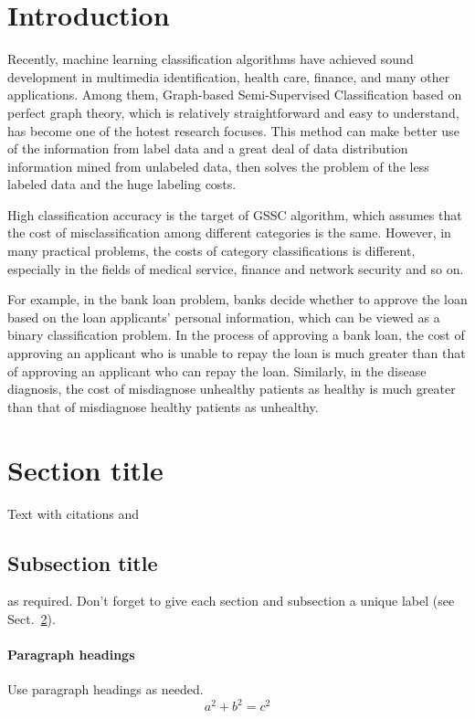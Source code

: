 \documentclass{svjour3}                     %
\begin{document}
\section{Introduction}
\label{intro}

Recently, machine learning classification algorithms have achieved sound development in multimedia identification, health care, finance, and many other applications. Among them, Graph-based Semi-Supervised Classification based on perfect graph theory, which is relatively straightforward and easy to understand, has become one of the hotest research focuses. This method can make better use of the information from label data and a great deal of data distribution information mined from unlabeled data, then solves the problem of the less labeled data and the huge labeling costs.

High classification accuracy is the target of GSSC algorithm, which assumes that the cost of misclassification among different categories is the same. However, in many practical problems,  the costs of category classifications is different, especially in the fields of medical service, finance and network security and so on.

For example, in the bank loan problem, banks decide whether to approve the loan based on the loan applicants' personal information, which can be viewed as a binary classification problem. In the process of approving a bank loan, the cost of approving an applicant who is unable to repay the loan is much greater than that of approving an applicant who can repay the loan. Similarly, in the disease diagnosis, the cost of misdiagnose unhealthy patients as healthy is much greater than that of misdiagnose healthy patients as unhealthy. 
\section{Section title}
\label{sec:1}
Text with citations  and %
\subsection{Subsection title}
\label{sec:2}
as required. Don't forget to give each section
and subsection a unique label (see Sect.~\ref{sec:1}).
\paragraph{Paragraph headings} Use paragraph headings as needed.
\begin{equation}
a^2+b^2=c^2
\end{equation}
\end{document}
